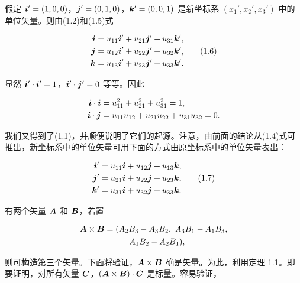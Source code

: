 假定 $\bm{i}' = (1, 0, 0)$，$\bm{j}' = (0, 1, 0)$，$\bm{k}' = (0, 0, 1)$ 是新坐标系 $(x_1', x_2', x_3')$ 中的单位矢量。则由(1.2)和(1.5)式

\begin{equation}
\begin{aligned}
\bm{i} &= u_{11} \bm{i}' + u_{21} \bm{j}' + u_{31} \bm{k}',\\
\bm{j} &= u_{12} \bm{i}' + u_{22} \bm{j}' + u_{32} \bm{k}',\\
\bm{k} &= u_{13} \bm{i}' + u_{23} \bm{j}' + u_{33} \bm{k}'.
\end{aligned}
\tag{1.6}
\end{equation}

显然 $\bm{i}' \cdot \bm{i}' = 1$，$\bm{i}' \cdot \bm{j}' = 0$ 等等。因此

\begin{equation*}
\begin{aligned}
\bm{i} \cdot \bm{i} &= u_{11}^{2} + u_{21}^{2} + u_{31}^{2} = 1,\\
\bm{i} \cdot \bm{j} &= u_{11} u_{12} + u_{21} u_{22} + u_{31} u_{32} = 0.
\end{aligned}
\end{equation*}

我们又得到了(1.1)，并顺便说明了它们的起源。注意，由前面的结论从(1.4)式可推出，新坐标系中的单位矢量可用下面的方式由原坐标系中的单位矢量表出：

\begin{equation}
\begin{aligned}
\bm{i}' &= u_{11} \bm{i} + u_{12} \bm{j} + u_{13} \bm{k},\\
\bm{j}' &= u_{21} \bm{i} + u_{22} \bm{j} + u_{23} \bm{k},\\
\bm{k}' &= u_{31} \bm{i} + u_{32} \bm{j} + u_{33} \bm{k}.
\end{aligned}
\tag{1.7}
\end{equation}

有两个矢量 $\bm{A}$ 和 $\bm{B}$，若置

\begin{equation*}
\begin{aligned}
\bm{A} \times \bm{B} &= (A_2 B_3 - A_3 B_2,\ A_3 B_1 - A_1 B_3,\\
&\qquad\quad A_1 B_2 - A_2 B_1),
\end{aligned}
\end{equation*}

则可构造第三个矢量。下面将验证，$\bm{A} \times \bm{B}$ 确是矢量。为此，利用定理 1.1。即要证明，对所有矢量 $\bm{C}$，$(\bm{A} \times \bm{B}) \cdot \bm{C}$ 是标量。容易验证，

